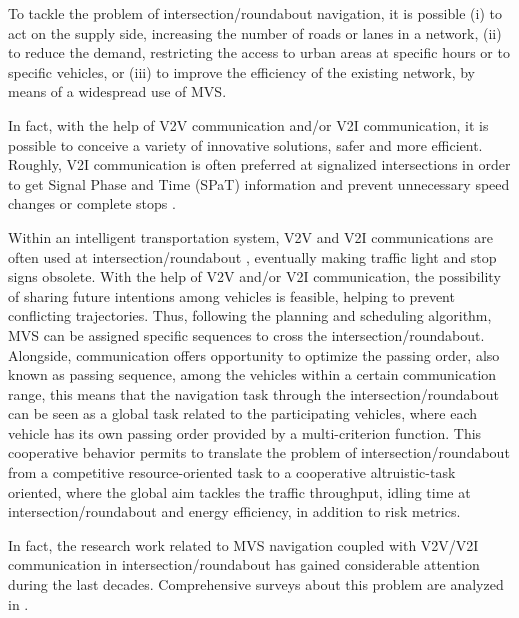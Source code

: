 To tackle the problem of intersection/roundabout navigation, it is possible (i) to act on the supply side, increasing the number of roads or lanes in a network, (ii) to reduce the demand, restricting the access to urban areas at specific hours or to specific vehicles, or (iii) to improve the efficiency of the existing network, by means of a widespread use of MVS.

In fact, with the help of V2V communication and/or V2I communication, it is possible to conceive a variety of innovative solutions, safer and more efficient. Roughly, V2I communication is often preferred at signalized intersections in order to get Signal Phase and Time (SPaT) information and prevent unnecessary speed changes or complete stops \cite{Eco-Approach}.

 Within an intelligent transportation system, V2V and V2I communications are often used at intersection/roundabout  \cite{guanetti2018control}\cite{wang2019survey}, eventually making traffic light and stop signs obsolete. With the help of V2V and/or V2I communication, the possibility of sharing future intentions among vehicles is feasible, helping to prevent conflicting trajectories. Thus, following the planning and scheduling algorithm, MVS can be assigned specific sequences to cross the intersection/roundabout. Alongside, communication offers opportunity to optimize the passing order, also known as passing sequence, among the vehicles within a certain communication range, this means that the navigation task through the intersection/roundabout can be seen as a global task related to the participating vehicles, where each vehicle has its own passing order provided by a multi-criterion function. This cooperative behavior permits to translate the problem of intersection/roundabout from a competitive resource-oriented task to a cooperative altruistic-task oriented, where the global aim tackles the traffic throughput, idling time at intersection/roundabout and energy efficiency, in addition to risk metrics.

In fact, the research work related to MVS navigation coupled with V2V/V2I communication in intersection/roundabout has gained considerable attention during the last decades. Comprehensive surveys about this problem are analyzed in \cite{chen2015cooperative}\cite{elliott2019recent}\cite{guo2019urban}\cite{namazi2019intelligent}\cite{rasheed2013fleet}. 



